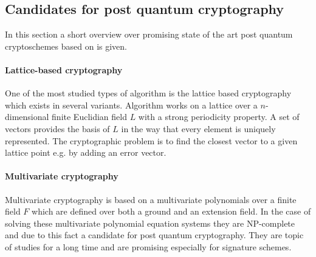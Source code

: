 
\subsection*{Candidates for post quantum cryptography}
\label{pqalgcand}
In this section a short overview over promising state of the art post quantum cryptoschemes based on \cite{bernstein2009introduction} is given. 
\paragraph*{Lattice-based cryptography}
One of the most studied types of algorithm is the lattice based cryptography which exists in several variants. Algorithm works on a lattice over a $n$-dimensional finite Euclidian field $L$ with a strong periodicity property. A set of vectors provides the basis of $L$ in the way that every element is uniquely represented. The cryptographic problem is to find the closest vector to a given lattice point e.g. by adding an error vector\cite{bernstein2009introduction}\cite{wiki:lattice}.
\paragraph*{Multivariate cryptography}
Multivariate cryptography is based on a multivariate polynomials over a finite field $F$ which are defined over both a ground and an extension field. In the case of solving these multivariate polynomial equation systems they are NP-complete and due to this fact a candidate for post quantum cryptography. They are topic of studies for a long time and  are promising especially for signature schemes\cite{bernstein2009introduction}\cite{wiki:multi}.

